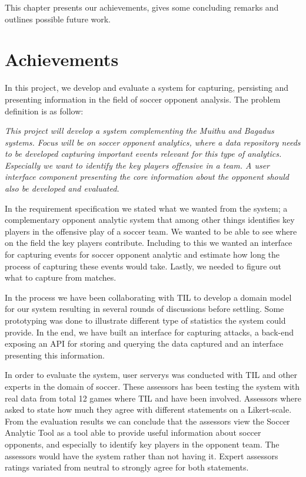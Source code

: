 This chapter presents our achievements, gives some concluding remarks and outlines possible future work.

\section{Achievements}
In this project, we develop and evaluate a system for capturing, persisting and presenting information in the field of soccer opponent analysis. The problem definition is as follow:

\textit{This project will develop a system complementing the Muithu and Bagadus systems. Focus will be on soccer opponent analytics, where a data repository needs to be developed capturing important events relevant for this type of analytics. Especially we want to identify the key players offensive in a team. A user interface component presenting the core information about the opponent should also be developed and evaluated.}

In the requirement specification we stated what we wanted from the system; a complementary opponent analytic system that among other things identifies key players in the offensive play of a soccer team. We wanted to be able to see where on the field the key players contribute. Including to this we wanted an interface for capturing events for soccer opponent analytic and estimate how long the process of capturing these events would take. Lastly, we needed to figure out what to capture from matches.

In the process we have been collaborating with \ac{TIL} to develop a domain model for our system resulting in several rounds of discussions before settling. Some prototyping was done to illustrate different type of statistics the system could provide. In the end, we have built an interface for capturing attacks, a back-end exposing an API for storing and querying the data captured and an interface presenting this information.

In order to evaluate the system, user serverys was conducted with \ac{TIL} and other experts in the domain of soccer. These assessors has been testing the system with real data from total 12 games where \ac{TIL} and {\SIF} have been involved. Assessors where asked to state how much they agree with different statements on a Likert-scale. From the evaluation results we can conclude that the assessors view the Soccer Analytic Tool as a tool able to provide useful information about soccer opponents, and especially to identify key players in the opponent team. The assessors would have the system rather than not having it. Expert assessors ratings variated from neutral to strongly agree for both statements.

